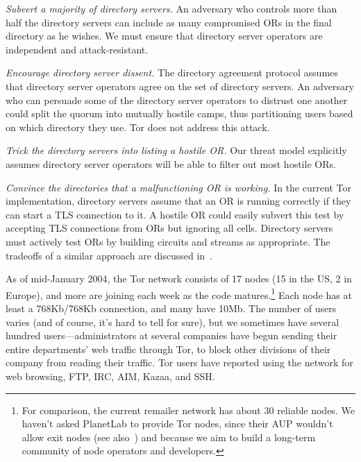 \documentclass[times,10pt,twocolumn]{article}
\begin{document}
\emph{Subvert a majority of directory servers.} An adversary who controls
more than half the directory servers can include as many compromised
ORs in the final directory as he wishes. We must ensure that directory
server operators are independent and attack-resistant.

\emph{Encourage directory server dissent.}  The directory
agreement protocol assumes that directory server operators agree on
the set of directory servers.  An adversary who can persuade some
of the directory server operators to distrust one another could
split the quorum into mutually hostile camps, thus partitioning
users based on which directory they use.  Tor does not address
this attack.

\emph{Trick the directory servers into listing a hostile OR.}
Our threat model explicitly assumes directory server operators will
be able to filter out most hostile ORs.

\emph{Convince the directories that a malfunctioning OR is
working.}  In the current Tor implementation, directory servers
assume that an OR is running correctly if they can start a TLS
connection to it.  A hostile OR could easily subvert this test by
accepting TLS connections from ORs but ignoring all cells. Directory
servers must actively test ORs by building circuits and streams as
appropriate.  The tradeoffs of a similar approach are discussed
in~\cite{mix-acc}.\\

\label{sec:in-the-wild}

As of mid-January 2004, the Tor network consists of 17 nodes
(15 in the US, 2 in Europe), and more are joining each week as the code
matures.\footnote{For comparison, the current remailer network
has about 30 reliable nodes. We haven't asked PlanetLab to provide
Tor nodes, since their AUP wouldn't allow exit nodes (see
also~\cite{darkside}) and because we aim to build a long-term community of
node operators and developers.} Each node has at least a 768Kb/768Kb
connection, and
many have 10Mb. The number of users varies (and of course, it's hard to
tell for sure), but we sometimes have several hundred users---administrators at
several companies have begun sending their entire departments' web
traffic through Tor, to block other divisions of
their company from reading their traffic. Tor users have reported using
the network for web browsing, FTP, IRC, AIM, Kazaa, and SSH.
\end{document}
